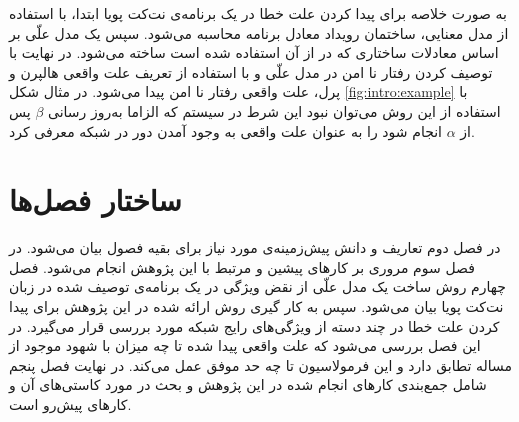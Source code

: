 به صورت خلاصه برای پیدا کردن علت خطا در یک برنامه‌ی نت‌کت پویا ابتدا، با استفاده از مدل‌ معنایی، ساختمان رویداد معادل برنامه محاسبه می‌شود. 
سپس یک مدل علّی%
 بر اساس معادلات ساختاری%
که در 
\cite{hp}
از آن استفاده شده است ساخته می‌شود.
در نهایت با توصیف کردن رفتار نا امن%
در مدل علّی
 و با استفاده از تعریف علت واقعی هالپرن و پرل، علت واقعی رفتار نا امن پیدا می‌شود.
در مثال شکل 
\ref{fig:intro:example}
با استفاده از این روش می‌توان نبود این شرط در سیستم که الزاما به‌روز رسانی 
$\beta$
پس از 
$\alpha$
انجام شود را به عنوان علت واقعی به وجود آمدن دور در شبکه معرفی کرد.

\section{ساختار فصل‌ها}
در فصل دوم تعاریف و دانش پیش‌زمینه‌ی مورد نیاز برای بقیه فصول 
بیان می‌شود.
 در فصل سوم مروری بر کار‌های پیشین و مرتبط با این پژوهش انجام می‌شود.
فصل چهارم روش ساخت یک مدل علّی از نقض ویژگی در یک برنامه‌ی توصیف شده در زبان نت‌کت پویا
بیان می‌شود.
سپس به کار گیری روش ارائه شده در این پژوهش برای پیدا کردن علت خطا در چند دسته از ویژگی‌های رایج شبکه مورد بررسی قرار می‌گیرد. در این فصل بررسی می‌شود که علت واقعی پیدا شده تا چه میزان با شهود موجود از مساله تطابق دارد و این فرمولاسیون تا چه حد موفق عمل می‌کند.
در نهایت فصل پنجم شامل جمع‌بندی کار‌های انجام شده در این پژوهش و بحث در مورد کاستی‌های آن و کار‌های پیش‌رو است.

